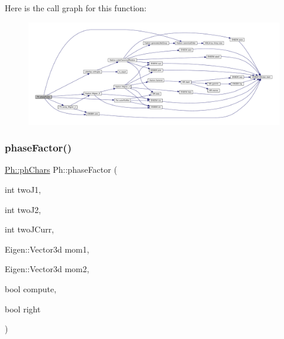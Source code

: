 Here is the call graph for this function\+:
\nopagebreak
\begin{figure}[H]
\begin{center}
\leavevmode
\includegraphics[width=350pt]{d6/d3c/namespacePh_a51140cf285f02c028134a1e40807b54b_cgraph}
\end{center}
\end{figure}
\mbox{\label{namespacePh_abd30593224e56992e6e15dc98728ad0b}} 
\subsubsection{\texorpdfstring{phaseFactor()}{phaseFactor()}\hspace{0.1cm}{\footnotesize\ttfamily [2/2]}}
{\footnotesize\ttfamily \mbox{\hyperlink{structPh_1_1phChars}{Ph\+::ph\+Chars}} Ph\+::phase\+Factor (\begin{DoxyParamCaption}\item[{int}]{two\+J1,  }\item[{int}]{two\+J2,  }\item[{int}]{two\+J\+Curr,  }\item[{Eigen\+::\+Vector3d}]{mom1,  }\item[{Eigen\+::\+Vector3d}]{mom2,  }\item[{bool}]{compute,  }\item[{bool}]{right }\end{DoxyParamCaption})}

